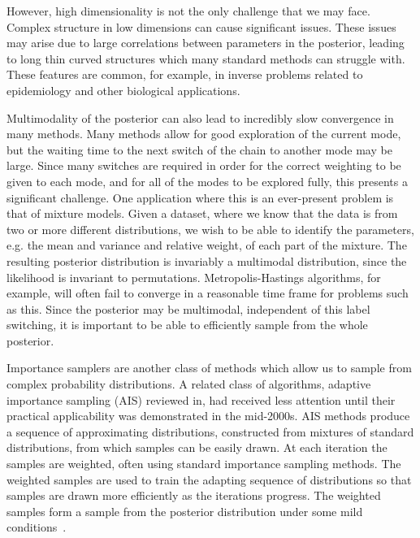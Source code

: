 \documentclass[final]{siamltex}
\begin{document}
However, high dimensionality is not the only challenge that we may
face. Complex structure in low
dimensions can cause significant issues. These issues may arise due to
large correlations between parameters in the posterior, leading to
long thin curved structures which many standard methods can struggle
with. These features are common, for example, in inverse problems
related to epidemiology and
other biological applications\cite{house2016bayesian}. 

Multimodality of the posterior can also lead to
incredibly slow convergence in many methods. Many methods allow for
good exploration of the current mode, but the waiting time to the next
switch of the chain to another mode may be large. Since many switches
are required in order for the correct weighting to be given to each
mode, and for all of the modes to be explored fully, this presents a
significant challenge. One application where this is an ever-present problem is that of
mixture models. Given a dataset, where we know that the data is from
two or more different distributions, we wish to be able to identify
the parameters, e.g. the mean and variance and relative weight, of
each part of the mixture\cite{marin2005bayesian}. The resulting posterior
distribution is invariably a multimodal distribution, since the likelihood is
invariant to permutations. Metropolis-Hastings algorithms, for
example, will often fail to converge in a reasonable time frame for
problems such as this. Since the posterior may be multimodal,
independent of this label switching, it is important to be able
to efficiently sample from the whole posterior.

Importance samplers are another class of methods which allow
us to sample from complex probability distributions. A related class of algorithms, adaptive importance sampling (AIS)
\cite{liu2008monte} reviewed in\cite{bugallo2015adaptive}, had
received less attention until their practical applicability was
demonstrated in the
mid-2000s\cite{celeux2006iterated,cappepopulation,isard1998condensation,bink2008bayesian}.
AIS methods produce a sequence of approximating distributions,
constructed from mixtures of standard distributions, from which samples can be
easily drawn. At each iteration the samples are weighted, often using
standard importance sampling methods. The weighted samples are used to
train the adapting sequence of distributions so that samples are drawn
more efficiently as the iterations progress. The weighted samples form
a sample from the posterior distribution under some mild
conditions~\cite{robert2013monte,martino2015adaptive}.
\end{document}
